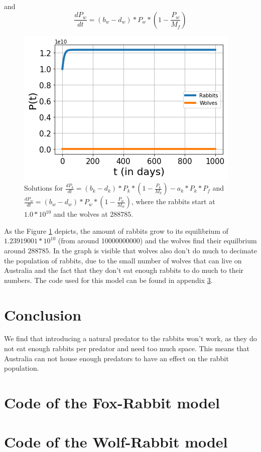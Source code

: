 \documentclass{article}
\begin{document}
and 
$$\frac{dP_w}{dt}=(b_w-d_w)*P_w*(1-\frac{P_w}{M_f})$$
\begin{figure}[h!]
    \centering
    \includegraphics[scale=0.78]{Pictures/RabbitWolves.png}
    \caption{Solutions for $\frac{dP_k}{dt}=(b_k-d_k)*P_k*(1-\frac{P_k}{M_k})-a_k*P_k*P_f$ and $\frac{dP_w}{dt}=(b_w-d_w)*P_w*(1-\frac{P_w}{M_w})$, where the rabbits start at $1.0*10^{10}$ and the wolves at $288785$.}
    \label{fig:RabbitsWolves}
\end{figure}
As the Figure \ref{fig:RabbitsWolves} depicts, the amount of rabbits grow to its equilibrium of $1.23919001*10^{10}$ (from around 10000000000) and the wolves find their equilbrium around $288785$. In the graph is visible that wolves also don't do much to decimate the population of rabbits, due to the small number of wolves that can live on Australia and the fact that they don't eat enough rabbits to do much to their numbers. The code used for this model can be found in appendix \ref{WolfRabbitModel}.
\section{Conclusion}
We find that introducing a natural predator to the rabbits won't work, as they do not eat enough rabbits per predator and need too much space. This means that Australia can not house enough predators to have an effect on the rabbit population.
\medskip

\appendix
\section{Code of the Fox-Rabbit model}\label{FoxRabbitModel}

\section{Code of the Wolf-Rabbit model}\label{WolfRabbitModel}

\end{document}
